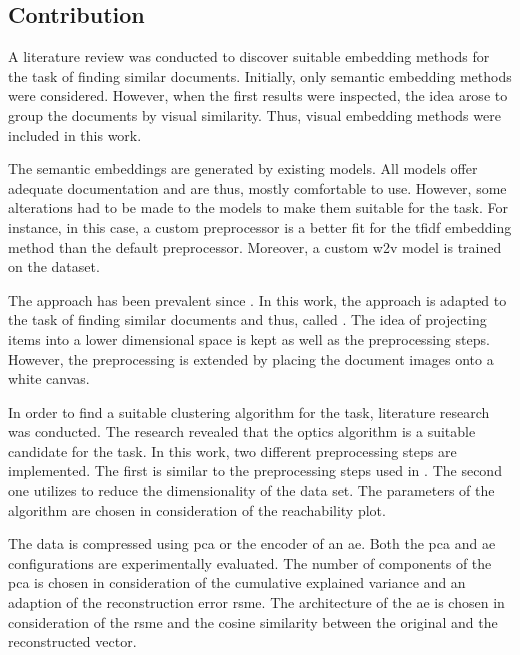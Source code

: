 \subsection{Contribution}\label{subsec:contribution}
A literature review was conducted to discover suitable embedding methods for the task of finding similar documents.
Initially, only semantic embedding methods were considered.
However, when the first results were inspected, the idea arose to group the documents by visual similarity.
Thus, visual embedding methods were included in this work.

The semantic embeddings are generated by existing models.
All models offer adequate documentation and are thus, mostly comfortable to use.
However, some alterations had to be made to the models to make them suitable for the task.
For instance, in this case, a custom preprocessor is a better fit for the \ac{tfidf} embedding method than the default preprocessor.
Moreover, a custom \ac{w2v} model is trained on the dataset.

The \eigenfaces{} approach has been prevalent since \citeyear{eigenfaces1991}.
In this work, the approach is adapted to the task of finding similar documents and thus, called \eigendocs{}.
The idea of projecting items into a lower dimensional space is kept as well as the preprocessing steps.
However, the preprocessing is extended by placing the document images onto a white canvas.


In order to find a suitable clustering algorithm for the task, literature research was conducted.
The research revealed that the \ac{optics} algorithm is a suitable candidate for the task.
In this work, two different preprocessing steps are implemented.
The first is similar to the preprocessing steps used in \cite{OPTICS1999}.
The second one utilizes \eigendocs{} to reduce the dimensionality of the data set.
The parameters of the algorithm are chosen in consideration of the reachability plot.


The data is compressed using \ac{pca} or the encoder of an \ac{ae}.
Both the \ac{pca} and \ac{ae} configurations are experimentally evaluated.
The number of components of the \ac{pca} is chosen in consideration of the cumulative explained variance 
and an adaption of the reconstruction error \ac{rsme}.
The architecture of the \ac{ae} is chosen in consideration of the \ac{rsme} and 
the cosine similarity between the original and the reconstructed vector.


